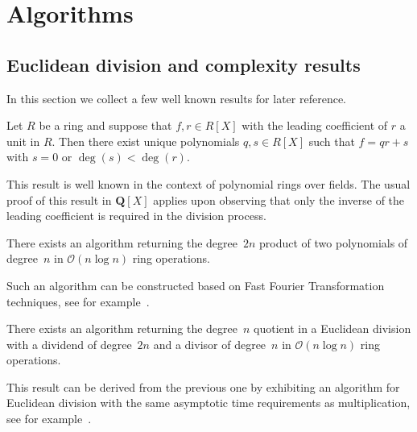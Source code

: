 
\chapter{Algorithms}
\label{ch:02-Algorithms}


\section{Euclidean division and complexity results}
\label{sec:EuclideanDivision}

In this section we collect a few well known results for later 
reference.

\begin{prop}
Let $R$ be a ring and suppose that $f, r \in R[X]$ with the 
leading coefficient of $r$ a unit in $R$.  Then there exist 
unique polynomials $q, s \in R[X]$ such that $f = q r + s$ 
with $s = 0$ or $\deg(s) < \deg(r)$.
\end{prop}

This result is well known in the context of polynomial rings 
over fields.  The usual proof of this result in $\mathbf{Q}[X]$ 
applies upon observing that only the inverse of the leading 
coefficient is required in the division process.

\begin{prop} \label{prop:mul}
There exists an algorithm returning the degree~$2n$ product 
of two polynomials of degree~$n$ in $\mathcal{O}(n \log n)$ 
ring operations.
\end{prop}

Such an algorithm can be constructed based on Fast Fourier Transformation 
techniques, see for example~\citep[\S 8]{GathenGerhard2003}.

\begin{prop} \label{prop:div1}
There exists an algorithm returning the degree~$n$ quotient 
in a Euclidean division with a dividend of degree~$2n$ 
and a divisor of degree~$n$ in $\mathcal{O}(n \log n)$ 
ring operations.
\end{prop}

This result can be derived from the previous one by exhibiting an algorithm 
for Euclidean division with the same asymptotic time requirements as 
multiplication, see for example~\citep[\S 11]{GathenGerhard2003}.

